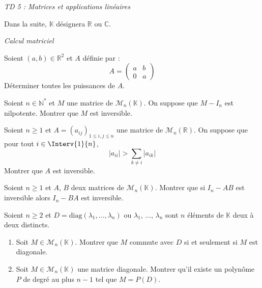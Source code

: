 \documentclass[a4paper,10pt]{report}
\begin{document}
\everymath{\displaystyle}

\begin{center}
\textit{{ {\huge TD 5 : Matrices et applications linéaires }}}
\end{center}

\bigskip

\noindent Dans la suite, $\mathbb{K}$ désignera $\mathbb{R}$ ou $\mathbb{C}$.

\medskip

\begin{center}
\textit{{ {\large Calcul matriciel}}}
\end{center}

\begin{Exa} Soient $(a,b) \in \mathbb{R}^2$ et $A$ définie par :
$$ A = \begin{pmatrix}
a & b \\
0  & a
\end{pmatrix}$$ 
Déterminer toutes les puissances de $A$.
\end{Exa}

\begin{Exa} Soient $n \in \mathbb{N}^*$ et $M$ une matrice de $\mathcal{M}_n(\mathbb{K})$. On suppose que $M-I_n$ est nilpotente. Montrer que $M$ est inversible.
\end{Exa}

 \begin{Exa}[\ding{80}] Soient $n \geq 1$ et $A = (a_{ij})_{1 \leq i,j \leq n}$ une matrice de $\mathcal{M}_n(\mathbb{R})$. On suppose que pour tout $i \in \Interv{1}{n}$,
$$ \vert a_{ii} \vert > \sum_{k \neq i} \vert a_{ik} \vert $$
Montrer que $A$ est inversible.
\end{Exa}

\begin{Exa}[\ding{80}] Soient $n\geq 1$ et $A$, $B$ deux matrices de $\mathcal{M}_n(\mathbb{K})$. Montrer que si $I_n - AB$ est inversible alors $I_n - BA$ est inversible.
\end{Exa} 

\begin{Exa} Soient $n \geq 2$ et $D= \textrm{diag}(\lambda_1, \ldots, \lambda_n)$ ou $\lambda_1$, $\ldots$, $\lambda_n$ sont $n$ éléments de $\mathbb{K}$ deux à deux distincts.
\begin{enumerate}
\item Soit $M \in \mathcal{M}_n(\mathbb{K})$. Montrer que $M$ commute avec $D$ si et seulement si $M$ est diagonale.
\item Soit $M \in \mathcal{M}_n(\mathbb{K})$ une matrice diagonale. Montrer qu'il existe un polynôme $P$ de degré au plus $n-1$ tel que $M=P(D)$.
\end{enumerate}
\end{Exa}
\end{document}
